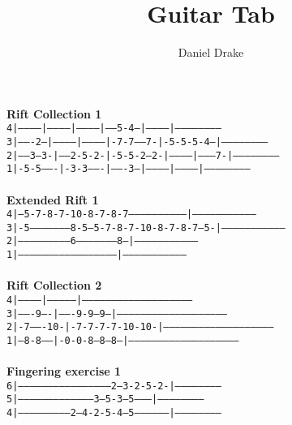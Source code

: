 \documentclass[12pt]{extarticle}
\title{Guitar Tab}
\author{Daniel Drake}
\def\code#1{\texttt{#1}}
\begin{document}
\maketitle
\noindent
\textbf{Rift Collection 1} \\
\code{4|-----------|-----------|-----------|-----5-4---|-----------|------------------------}\\
\code{3|-------2---|-----------|-----------|-7-7-----7-|-5-5-5-4---|------------------------}\\
\code{2|-----3---3-|-----2-5-2-|-5-5-2---2-|-----------|---------7-|------------------------}\\
\code{1|-5-5-------|-3-3-------|-------3---|-----------|-----------|------------------------}\\\\
\textbf{Extended Rift 1} \\
\code{4|---5-7-8-7-10-8-7-8-7------------------------------|---------------------------------}\\
\code{3|-5--------------------8-5---5-7-8-7-10-8-7-8-7---5-|---------------------------------}\\
\code{2|--------------------------6--------------------8---|--------------------------------}\\
\code{1|---------------------------------------------------|--------------------------------}\\\\
\textbf{Rift Collection 2} \\
\code{4|------------|---------------|---------------------------------------------------------}\\
\code{3|-------9----|-------9-9--9--|---------------------------------------------------------}\\
\code{2|-7-------10-|-7-7-7-7-10-10-|---------------------------------------------------------}\\
\code{1|---8-8------|-0-0-8---8--8--|---------------------------------------------------------}\\\\
\textbf{Fingering exercise 1}\\
\code{6|-----------------------------------------------2---3-2-5-2-|------------------------}\\
\code{5|---------------------------------------3---5-3---5---------|------------------------}\\
\code{4|---------------------------2---4-2-5-4---5-----------------|------------------------}\\
\end{document}
